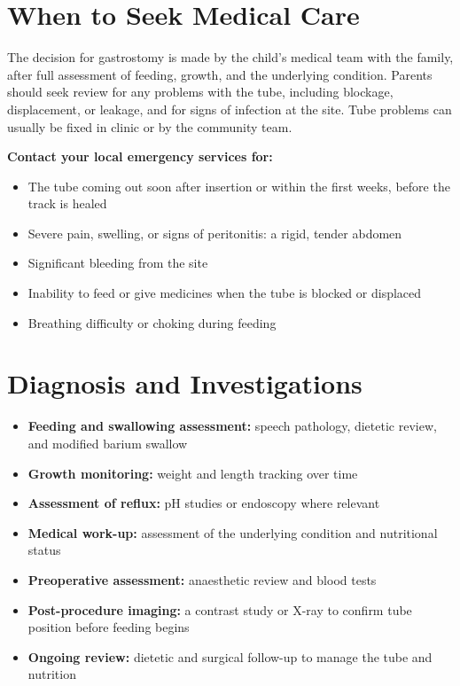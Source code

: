 \section*{When to Seek Medical Care}
The decision for gastrostomy is made by the child's medical team with the family, after full assessment of feeding, growth, and the underlying condition. Parents should seek review for any problems with the tube, including blockage, displacement, or leakage, and for signs of infection at the site. Tube problems can usually be fixed in clinic or by the community team.

\textbf{Contact your local emergency services for:}
\begin{itemize}
    \item The tube coming out soon after insertion or within the first weeks, before the track is healed
    \item Severe pain, swelling, or signs of peritonitis: a rigid, tender abdomen
    \item Significant bleeding from the site
    \item Inability to feed or give medicines when the tube is blocked or displaced
    \item Breathing difficulty or choking during feeding
\end{itemize}

\section*{Diagnosis and Investigations}
\begin{itemize}
    \item \textbf{Feeding and swallowing assessment:} speech pathology, dietetic review, and modified barium swallow
    \item \textbf{Growth monitoring:} weight and length tracking over time
    \item \textbf{Assessment of reflux:} pH studies or endoscopy where relevant
    \item \textbf{Medical work-up:} assessment of the underlying condition and nutritional status
    \item \textbf{Preoperative assessment:} anaesthetic review and blood tests
    \item \textbf{Post-procedure imaging:} a contrast study or X-ray to confirm tube position before feeding begins
    \item \textbf{Ongoing review:} dietetic and surgical follow-up to manage the tube and nutrition
\end{itemize}

